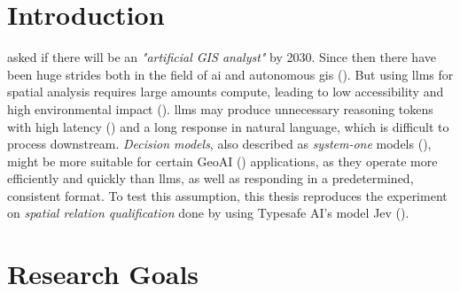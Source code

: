 




\maketitle

\begin{abstract}
{}

\vspace{3em}

\begin{otherlanguage*}{naustrian}
\end{otherlanguage*}
\end{abstract}

\tableofcontents
\printglossary[type=\acronymtype]

\chapter{Introduction}\label{Introduction}
\cite{janowiczGeoAISpatiallyExplicit2020} asked if there will be an \textit{"artificial GIS analyst"} by 2030. Since then there have been huge strides both in the field of \gls{ai} and autonomous \gls{gis} (\cite{liGIScienceEraArtificial2025}). But using \gls{llms} for spatial analysis requires large amounts compute, leading to low accessibility and high environmental impact (\cite{janowiczPhilosophicalFoundationsGeoAI2023, shiGeographyAISustainability2025}). \gls{llms} may produce unnecessary reasoning tokens with high latency (\cite{wangTruncatedReasoningBudget2026,chenNOTThinkThat2025,duanGeneralDecisionModels2026}) and a long response in natural language, which is difficult to process downstream. \textit{Decision models}, also described as \textit{system-one} models (\cite{kahnemanThinkingFastSlow2011}), might be more suitable for certain GeoAI (\cite{janowiczGeoAISpatiallyExplicit2020}) applications, as they operate more efficiently and quickly than \acrshort{llms}, as well as responding in a predetermined, consistent format. To test this assumption, this thesis reproduces the experiment on \textit{spatial relation qualification} done by \cite{jiFoundationModelsGeospatial2025} using Typesafe AI's model Jev (\cite{IntroducingSystemOne}).

\chapter{Research Goals}


